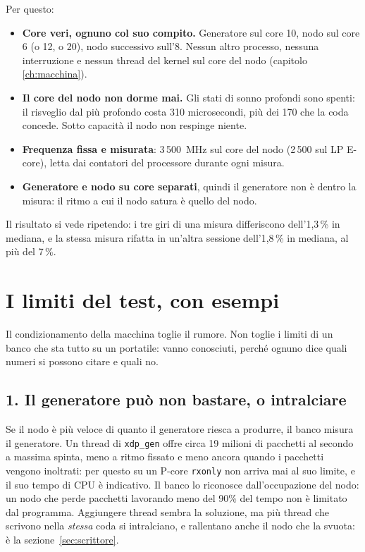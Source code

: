 \documentclass[11pt,a4paper,oneside]{report}
\begin{document}
Per questo:

\begin{itemize}
  \item \textbf{Core veri, ognuno col suo compito.} Generatore sul core 10, nodo
        sul core 6 (o 12, o 20), nodo successivo sull'8. Nessun altro processo,
        nessuna interruzione e nessun thread del kernel sul core del nodo
        (capitolo \ref{ch:macchina}).
  \item \textbf{Il core del nodo non dorme mai.} Gli stati di sonno profondi sono
        spenti: il risveglio dal più profondo costa 310 microsecondi, più dei 170
        che la coda concede. Sotto capacità il nodo non respinge niente.
  \item \textbf{Frequenza fissa e misurata}: 3\,500~MHz sul core del nodo
        (2\,500 sul LP E-core), letta dai contatori del processore durante ogni
        misura.
  \item \textbf{Generatore e nodo su core separati}, quindi il generatore non è
        dentro la misura: il ritmo a cui il nodo satura è quello del nodo.
\end{itemize}

Il risultato si vede ripetendo: i tre giri di una misura differiscono
dell'1,3\,\% in mediana, e la stessa misura rifatta in un'altra sessione
dell'1,8\,\% in mediana, al più del 7\,\%.

\section{I limiti del test, con esempi}
\label{sec:limiti}

Il condizionamento della macchina toglie il rumore. Non toglie i limiti di un
banco che sta tutto su un portatile: vanno conosciuti, perché ognuno dice quali numeri si possono citare
e quali no.

\subsection*{1. Il generatore può non bastare, o intralciare}

Se il nodo è più veloce di quanto il generatore riesca a produrre, il banco
misura il generatore. Un thread di \texttt{xdp\_gen} offre circa 19 milioni di
pacchetti al secondo a massima spinta, meno a ritmo fissato e meno ancora quando
i pacchetti vengono inoltrati: per questo su un P-core \texttt{rxonly} non arriva
mai al suo limite, e il suo tempo di CPU è indicativo. Il banco lo riconosce
dall'occupazione del nodo: un nodo che perde pacchetti lavorando meno del 90\%
del tempo non è limitato dal programma. Aggiungere thread sembra la soluzione,
ma più thread che scrivono nella \emph{stessa} coda si intralciano, e rallentano
anche il nodo che la svuota: è la sezione~\ref{sec:scrittore}.
\end{document}
